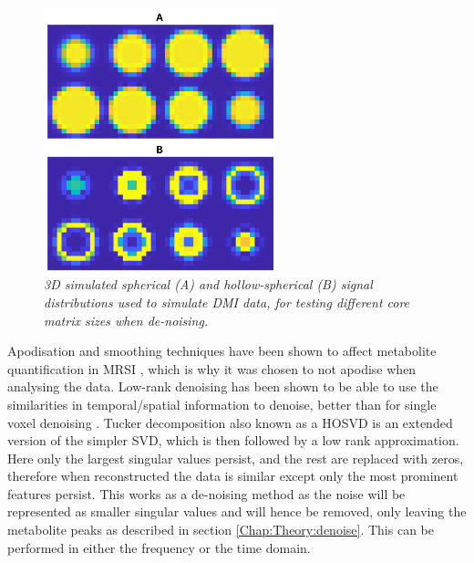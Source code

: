 \begin{figure}
    \centering
    \includegraphics[width = 0.6\textwidth]{Figures/Glucose/Template.png}
    \caption{\textit{3D simulated spherical (A) and hollow-spherical (B) signal distributions used to simulate \ac{DMI} data, for testing different core matrix sizes when de-noising.}}
    \label{fig:Glu:Temp}
\end{figure}

Apodisation and smoothing techniques have been shown to affect metabolite quantification in \ac{MRSI} \cite{Goryawala2020EffectsFitting}, which is why it was chosen to not apodise when analysing the data. Low-rank denoising has been shown to be able to use the similarities in temporal/spatial information to denoise, better than for single voxel denoising \cite{Brender2019DynamicHyperpolarization, Goryawala2020EffectsFitting}. Tucker decomposition also known as a \ac{HOSVD} is an extended version of the simpler \ac{SVD}, which is then followed by a low rank approximation. Here only the largest singular values persist, and the rest are replaced with zeros, therefore when reconstructed the data is similar except only the most prominent features persist. This works as a de-noising method as the noise will be represented as smaller singular values and will hence be removed, only leaving the metabolite peaks as described in section \ref{Chap:Theory:denoise}. This can be performed in either the frequency or the time domain. 

